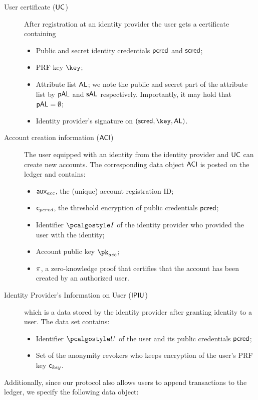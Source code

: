\documentclass[runningheads,10pt]{llncs}
\numberwithin{equation}{section}
\begin{document}
\begin{description}
\item[User certificate ($\mathsf{UC}$)] After registration at an identity provider the
  user gets a certificate containing
  \begin{itemize}
  \item Public and secret identity credentials $\mathsf{pcred}$ and $\mathsf{scred}$;
  \item PRF key $\key$;
  \item Attribute list $\mathsf{AL}$; we note the public and secret part of the attribute
    list by $\mathsf{pAL}$ and $\mathsf{sAL}$ respectively. Importantly, it may hold that
    $\mathsf{pAL} = \emptyset$;
  \item Identity provider's signature on $(\scred, \key, \AL)$.
  \end{itemize}
\item[Account creation information ($\mathsf{ACI}$)] The user equipped with an identity
  from the identity provider and $\mathsf{UC}$ can create new accounts. The
  corresponding data object $\mathsf{ACI}$ is posted on the ledger and contains:
  \begin{itemize}
  \item $\mathsf{aux}_{acc}$, the (unique) account registration ID;
  \item $\mathsf{c}_{pcred}$, the threshold encryption of public credentials $\mathsf{pcred}$;
  \item Identifier $\idprov$ of the identity provider who provided the user
    with the identity;
  \item Account public key $\pk_{acc}$;
  \item $\mathsf{\pi}$, a zero-knowledge proof that certifies that the account has
    been created by an authorized user.
  \end{itemize}
\item[Identity Provider's Information on User ($\mathsf{IPIU}$)] which is a data stored
  by the identity provider after granting identity to a user. The data set
  contains:
  \begin{itemize}
  \item Identifier $\user$ of the user and its public credentials $\mathsf{pcred}$;
  \item Set of the anonymity revokers who keeps encryption of the user's PRF
    key $\mathsf{c}_{key}$.
  \end{itemize}
\end{description}
Additionally, since our protocol also allows users to append transactions to
the ledger, we specify the following data object:
\end{document}
